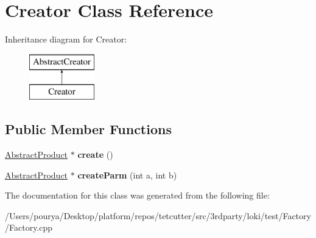 \hypertarget{classCreator}{}\section{Creator Class Reference}
\label{classCreator}
Inheritance diagram for Creator\+:\begin{figure}[H]
\begin{center}
\leavevmode
\includegraphics[height=2.000000cm]{classCreator}
\end{center}
\end{figure}
\subsection*{Public Member Functions}
\begin{DoxyCompactItemize}
\item 
\hypertarget{classCreator_a7b65b3b10857baac4ecbf1c7e4430d64}{}\hyperlink{classAbstractProduct}{Abstract\+Product} $\ast$ {\bfseries create} ()\label{classCreator_a7b65b3b10857baac4ecbf1c7e4430d64}

\item 
\hypertarget{classCreator_a9dc3d0a0c498a38905985f5a2e942d90}{}\hyperlink{classAbstractProduct}{Abstract\+Product} $\ast$ {\bfseries create\+Parm} (int a, int b)\label{classCreator_a9dc3d0a0c498a38905985f5a2e942d90}

\end{DoxyCompactItemize}


The documentation for this class was generated from the following file\+:\begin{DoxyCompactItemize}
\item 
/\+Users/pourya/\+Desktop/platform/repos/tetcutter/src/3rdparty/loki/test/\+Factory/Factory.\+cpp\end{DoxyCompactItemize}
